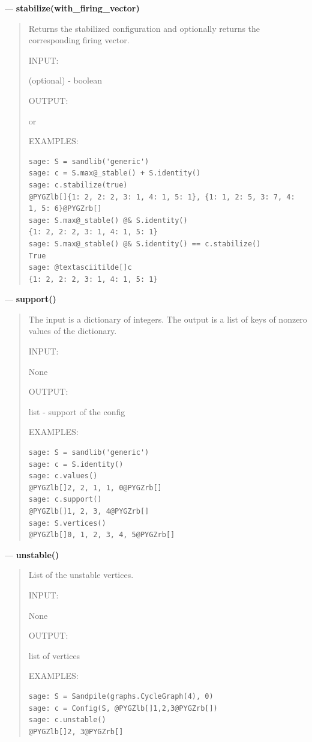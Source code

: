 \documentclass[letterpaper,10pt,english]{manual}
\begin{document}
---
\hypertarget{stabilize-with-firing-vector}{}
\textbf{stabilize(with\_firing\_vector)}
\begin{quote}

Returns the stabilized configuration and optionally returns the
corresponding firing vector.

INPUT:

 (optional) -  boolean

OUTPUT:

 or 

EXAMPLES:

\begin{Verbatim}[commandchars=@\[\]]
sage: S = sandlib('generic')
sage: c = S.max@_stable() + S.identity()
sage: c.stabilize(true)
@PYGZlb[]{1: 2, 2: 2, 3: 1, 4: 1, 5: 1}, {1: 1, 2: 5, 3: 7, 4: 1, 5: 6}@PYGZrb[]
sage: S.max@_stable() @& S.identity()
{1: 2, 2: 2, 3: 1, 4: 1, 5: 1}
sage: S.max@_stable() @& S.identity() == c.stabilize()
True
sage: @textasciitilde[]c
{1: 2, 2: 2, 3: 1, 4: 1, 5: 1}
\end{Verbatim}
\end{quote}

---
\hypertarget{support}{}
\textbf{support()}
\begin{quote}

The input is a dictionary of integers.  The output is a list of keys
of nonzero values of the dictionary.

INPUT:

None

OUTPUT:

list - support of the config

EXAMPLES:

\begin{Verbatim}[commandchars=@\[\]]
sage: S = sandlib('generic')
sage: c = S.identity()
sage: c.values()
@PYGZlb[]2, 2, 1, 1, 0@PYGZrb[]
sage: c.support()
@PYGZlb[]1, 2, 3, 4@PYGZrb[]
sage: S.vertices()
@PYGZlb[]0, 1, 2, 3, 4, 5@PYGZrb[]
\end{Verbatim}
\end{quote}

---
\hypertarget{unstable}{}
\textbf{unstable()}
\begin{quote}

List of the unstable vertices.

INPUT:

None

OUTPUT:

list of vertices

EXAMPLES:

\begin{Verbatim}[commandchars=@\[\]]
sage: S = Sandpile(graphs.CycleGraph(4), 0)
sage: c = Config(S, @PYGZlb[]1,2,3@PYGZrb[])
sage: c.unstable()
@PYGZlb[]2, 3@PYGZrb[]
\end{Verbatim}
\end{quote}
\end{document}
